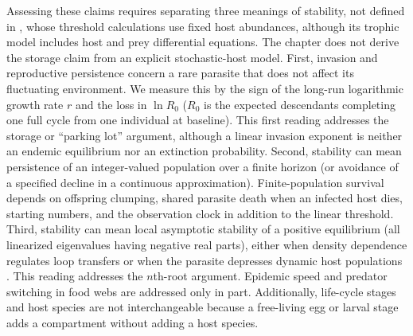Assessing these claims requires separating three meanings of stability, not defined in \citet{dobson2020}, whose threshold calculations use fixed host abundances, although its trophic model includes host and prey differential equations. The chapter does not derive the storage claim from an explicit stochastic-host model. First, invasion and reproductive persistence concern a rare parasite that does not affect its fluctuating environment. We measure this by the sign of the long-run logarithmic growth rate $r$ and the loss in $\ln R_0$ ($R_0$ is the expected descendants completing one full cycle from one individual at baseline). This first reading addresses the storage or ``parking lot'' argument, although a linear invasion exponent is neither an endemic equilibrium nor an extinction probability. Second, stability can mean persistence of an integer-valued population over a finite horizon (or avoidance of a specified decline in a continuous approximation). Finite-population survival depends on offspring clumping, shared parasite death when an infected host dies, starting numbers, and the observation clock in addition to the linear threshold. Third, stability can mean local asymptotic stability of a positive equilibrium (all linearized eigenvalues having negative real parts), either when density dependence regulates loop transfers or when the parasite depresses dynamic host populations \citep{anderson1978,dobson1992}. This reading addresses the $n$th-root argument. Epidemic speed and predator switching in food webs are addressed only in part. Additionally, life-cycle stages and host species are not interchangeable because a free-living egg or larval stage adds a compartment without adding a host species.

